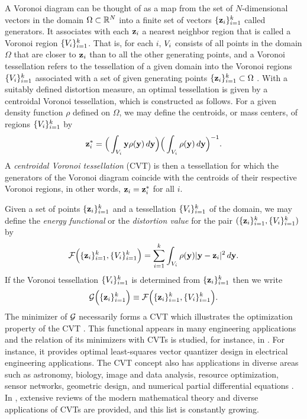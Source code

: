 \documentclass{siamltex}
\begin{document}
A Voronoi diagram can be thought of as a map from the set of $N$-dimensional vectors in the domain $\Omega\subset{\mathbb R}^{N}$ into a finite set of vectors $\{{{\bf z}}_i\}_{i=1}^k$ called generators. It associates with each ${{\bf z}}_i$ a nearest neighbor region that is called a Voronoi region $\{{V_i}\}_{i=1}^k$. That is, for each $i$, ${V_i}$ consists of all points in the domain $\Omega$ that are closer to ${\bf z}_i$ than to all the other generating points, and a Voronoi tessellation refers to the tessellation of a given domain into the Voronoi regions $\{{V_i}\}_{i=1}^k$ associated with a set of given generating points $\{{{\bf z}}_i\}_{i=1}^k\subset \Omega$ \cite{au90,Okabe}. With a suitably defined distortion measure, an optimal tessellation is given by a centroidal Voronoi tessellation, which is constructed as follows. For a given density function $\rho$ defined on $\Omega$, we may define the centroids, or mass centers, of  regions $\{{V_i}\}_{i=1}^k$ by
$$
{{\bf z}}_i^* =
{\Big(}
\int_{{V_i}} {\bf y}\rho({\bf y})\,d{\bf y}
{\Big)}
{\Big(}
\int_{{V_i}} \rho({\bf y})\,d{\bf y}
{\Big)}^{-1}.
 $$
 A {\em centroidal Voronoi tessellation} (CVT) is then a tessellation for which the generators of the Voronoi diagram coincide with the centroids of their respective Voronoi regions, in other words, ${{\bf z}}_i={{\bf z}}_i^*$ for all $i$.

Given a set of points $\{{{\bf z}}_i\}_{i=1}^k$  and a tessellation $\{{V_i}\}_{i=1}^k$ of the domain, we may define the {\em energy functional} or the {\em distortion value} for the pair $(\{{{\bf z}}_i\}_{i=1}^k,\{{V_i}\}_{i=1}^k)$  by
$$ \label{ener}
{\cf}\Bigl(\bzin,\vin\Bigr)
=
\sum_{i=1}^k  \int_{\vi} \rho(\by)|\by - \bzi|^2 \,d\by.
$$
If the Voronoi tessellation $\{{V_i}\}_{i=1}^k$ is determined from $\{{{\bf z}}_i\}_{i=1}^k$ then we write
\begin{equation}
{\cg}\Bigl(\bzin\Bigr) \equiv {\cf}\Bigl(\bzin,\vin\Bigr).
\label{energy}
\end{equation}
The minimizer of $\cg$ necessarily forms a CVT which illustrates the optimization property of the CVT \cite{DFG}. This functional appears in many engineering applications and the relation of its minimizers with CVTs is studied, for instance, in \cite{Gersho, Gray98, Trushkin}. For instance, it provides optimal least-squares vector quantizer design in electrical engineering applications. The CVT concept also has applications  in diverse areas such as astronomy, biology, image and data analysis, resource optimization, sensor networks, geometric design, and numerical partial differential equations \cite{Cortes, DFG, DG02, DGJ02, DGJ03, DW1, DW3, Hiller03, JDG02, Mendes04, Brain04, Mesh04}. In \cite{DFG,DGJ10}, extensive reviews of the modern mathematical theory and diverse applications of CVTs are provided, %
and this list is constantly growing.
\end{document}
